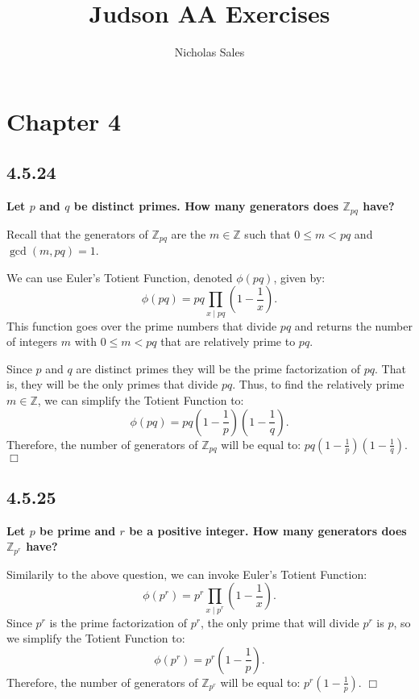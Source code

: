 \documentclass[11pt, a4paper]{article}
\title{Judson AA Exercises}
\author{Nicholas Sales}
\date{}
\begin{document}
\maketitle 
\tableofcontents

\newpage
\section{Chapter 4}

\subsection{4.5.24}
\textbf{Let $p$ and $q$ be distinct primes. How many generators does $\mathbb{Z}_{pq}$ have?}

Recall that the generators of $\mathbb{Z}_{pq}$ are the $m \in \mathbb{Z}$ such that $0 \leq m < pq$ and $\gcd(m, pq) = 1$. 

We can use Euler's Totient Function, denoted $\phi(pq)$, given by:
\[
  \phi(pq) = pq \prod_{x \mid pq} \left ( 1 - \frac{1}{x} \right ).
\]
This function goes over the prime numbers that divide $pq$ and returns the number of integers $m$ with $0 \leq m < pq$ that are relatively prime to $pq$. 

Since $p$ and $q$ are distinct primes they will be the prime factorization of $pq$. That is, they will be the only primes that divide $pq$. Thus, to find the relatively prime $m \in \mathbb{Z}$, we can simplify the Totient Function to:
\[
  \phi(pq) = pq \left ( 1 - \frac{1}{p} \right ) \left ( 1 - \frac{1}{q} \right ).
\]
Therefore, the number of generators of $\mathbb{Z}_{pq}$ will be equal to: $pq \left ( 1 - \frac{1}{p} \right ) \left ( 1 - \frac{1}{q} \right )$. $\Box$

\subsection{4.5.25}
\textbf{Let $p$ be prime and $r$ be a positive integer. How many generators does $\mathbb{Z}_{p^r}$ have?}

Similarily to the above question, we can invoke Euler's Totient Function:
\[
  \phi(p^r) = p^r \prod_{x \mid p^r} \left ( 1 - \frac{1}{x} \right ).
\]
Since $p^r$ is the prime factorization of $p^r$, the only prime that will divide $p^r$ is $p$, so we simplify the Totient Function to:
\[
  \phi(p^r) = p^r \left ( 1 - \frac{1}{p} \right ).
\]
Therefore, the number of generators of $\mathbb{Z}_{p^r}$ will be equal to: $p^r \left ( 1 - \frac{1}{p} \right )$. $\Box$
\end{document}
